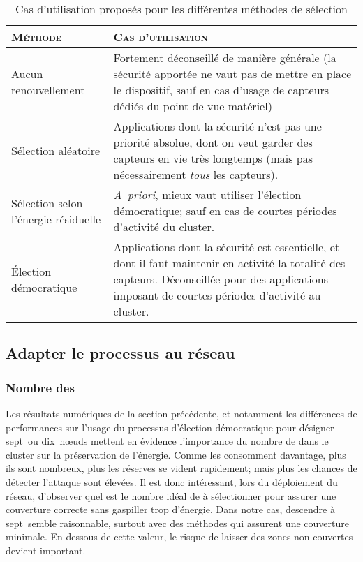 \begin{table}[ht]
    \centering
    \caption{Cas d'utilisation proposés pour les différentes méthodes de sélection}\label{sd:table:apps}
    \medskip
    \small
    \begin{tabu}{X[1,c,m] X[2,j,m]}
        \toprule
        \textsc{Méthode} & \textsc{Cas d'utilisation} \\
        \midrule
        Aucun renouvellement
            & Fortement déconseillé de manière générale (la sécurité apportée ne vaut pas de mettre en place le dispositif, sauf en cas d'usage de capteurs dédiés du point de vue matériel)
            \\
        \midrule
        Sélection aléatoire
            & Applications dont la sécurité n'est pas une priorité absolue, dont on veut garder des capteurs en vie très longtemps (mais pas nécessairement \emph{tous} les capteurs).
            \\
        \midrule
        Sélection selon l'énergie résiduelle
        & \textit{A~priori}, mieux vaut utiliser l'élection démocratique; sauf en cas de courtes périodes d'activité du cluster.
            \\
        \midrule
        Élection démocratique
            & Applications dont la sécurité est essentielle, et dont il faut maintenir en activité la totalité des capteurs. Déconseillée pour des applications imposant de courtes périodes d'activité au cluster.
            \\
        \bottomrule
    \end{tabu}
\end{table}

    \subsection{Adapter le processus au réseau}

        \subsubsection{Nombre des \cns}
Les résultats numériques de la section précédente, et notamment les différences de performances sur l'usage du processus d'élection démocratique pour désigner sept~ou dix~nœuds mettent en évidence l'importance du nombre de \cns dans le cluster sur la préservation de l'énergie.
Comme les \cns consomment davantage, plus ils sont nombreux, plus les réserves se vident rapidement; mais plus les chances de détecter l'attaque sont élevées.
Il est donc intéressant, lors du déploiement du réseau, d'observer quel est le nombre idéal de \cns à sélectionner pour assurer une couverture correcte sans gaspiller trop d'énergie.
Dans notre cas, descendre à sept~\cns semble raisonnable, surtout avec des méthodes qui assurent une couverture minimale.
En dessous de cette valeur, le risque de laisser des zones non couvertes devient important.

